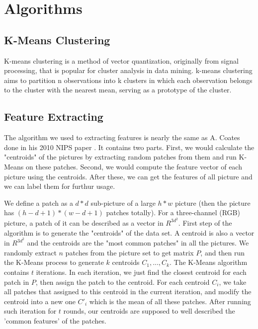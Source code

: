 \documentclass[12pt,abstract=true]{scrartcl}
\numberwithin{equation}{section}
\theoremstyle{definition}   \newtheorem{definition}{Definition}[section]
\theoremstyle{plain}        \newtheorem{theorem}{Theorem}[section]
\theoremstyle{plain}        \newtheorem{observation}{Observation}[section]
\theoremstyle{plain}        \newtheorem{fact}{Fact}[section]
\theoremstyle{plain}        \newtheorem{claim}{Claim}[section]
\theoremstyle{plain}        \newtheorem{lemma}[theorem]{Lemma}
\theoremstyle{plain}        \newtheorem{corollary}[theorem]{Corollary}
\theoremstyle{remark}       \newtheorem{example}{Example}[section]
\theoremstyle{remark}       \newtheorem{remark}{Remark}[section]
\begin{document}
\section{Algorithms}

	\subsection{K-Means Clustering}
		K-means clustering is a method of vector quantization, originally from signal processing, that is popular for cluster analysis in data mining. k-means
        clustering aims to partition n observations into k clusters in which each observation belongs to the cluster with the nearest mean, serving as a prototype of the cluster.                
        
	
	\subsection{Feature Extracting}
		The algorithm we used to extracting features is nearly the same
			as A. Coates done in his 2010 NIPS paper \cite{singlelayer}.
		It contains two parts.
		First, we would calculate the "centroids" of the pictures by extracting
			random patches from them and run K-Means on these patches.
		Second, we would compute the feature vector of each picture using the centroids.
		After these, we can get the features of all picture and we can label them for furthur usage.

		We define a patch as a $d*d$ sub-picture of a large $h*w$ picture
			(then the picture has $(h-d+1)*(w-d+1)$ patches totally).
		For a three-channel (RGB) picture, a patch of it can be described as a vector in $R^{3d^2}$.
		First step of the algorithm is to generate the "centroids" of the data set.
		A centroid is also a vector in $R^{3d^2}$ and the centroids are the
			"most common patches" in all the pictures.
		We randomly extract $n$ patches from the picture set to get matrix $P$,
			and then run the K-Means process to generate $k$ centroids $C_1,...,C_k$.
		The K-Means algorithm contains $t$ iterations.
		In each iteration, we just find the closest centroid for each patch in $P$,
			then assign the patch to the centroid.
		For each centroid $C_i$,
			we take all patches that assigned to this centroid in the current iteration,
			and modify the centroid into a new one $C'_i$ which is the mean of all these patches.
		After running such iteration for $t$ rounds,
			our centroids are supposed to well described the 'common features' of the patches.
\end{document}

